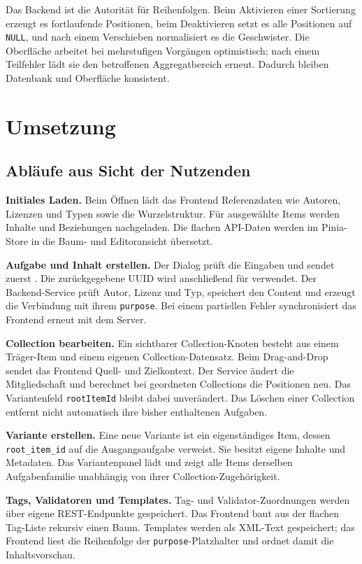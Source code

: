\documentclass[11pt,a4paper]{article}
\begin{document}
Das Backend ist die Autorität für Reihenfolgen. Beim Aktivieren einer
Sortierung erzeugt es fortlaufende Positionen, beim Deaktivieren setzt es alle
Positionen auf \texttt{NULL}, und nach einem Verschieben normalisiert es die
Geschwister. Die Oberfläche arbeitet bei mehrstufigen Vorgängen optimistisch;
nach einem Teilfehler lädt sie den betroffenen Aggregatbereich erneut. Dadurch
bleiben Datenbank und Oberfläche konsistent.

\section{Umsetzung}
\subsection{Abläufe aus Sicht der Nutzenden}
\textbf{Initiales Laden.} Beim Öffnen lädt das Frontend Referenzdaten wie
Autoren, Lizenzen und Typen sowie die Wurzelstruktur. Für ausgewählte Items
werden Inhalte und Beziehungen nachgeladen. Die flachen API-Daten werden im
Pinia-Store in die Baum- und Editoransicht übersetzt.

\textbf{Aufgabe und Inhalt erstellen.} Der Dialog prüft die Eingaben und sendet
zuerst . Die zurückgegebene UUID wird anschließend für
 verwendet. Der Backend-Service
prüft Autor, Lizenz und Typ, speichert den Content und erzeugt die Verbindung
mit ihrem \texttt{purpose}. Bei einem partiellen Fehler synchronisiert das
Frontend erneut mit dem Server.

\textbf{Collection bearbeiten.} Ein sichtbarer Collection-Knoten besteht aus
einem Träger-Item und einem eigenen Collection-Datensatz. Beim Drag-and-Drop
sendet das Frontend Quell- und Zielkontext. Der Service ändert die
Mitgliedschaft und berechnet bei geordneten Collections die Positionen neu.
Das Variantenfeld \texttt{rootItemId} bleibt dabei unverändert. Das Löschen
einer Collection entfernt nicht automatisch ihre bisher enthaltenen Aufgaben.

\textbf{Variante erstellen.} Eine neue Variante ist ein eigenständiges Item,
dessen \texttt{root\_item\_id} auf die Ausgangsaufgabe verweist. Sie besitzt
eigene Inhalte und Metadaten. Das Variantenpanel lädt und zeigt alle Items
derselben Aufgabenfamilie unabhängig von ihrer Collection-Zugehörigkeit.

\textbf{Tags, Validatoren und Templates.} Tag- und Validator-Zuordnungen
werden über eigene REST-Endpunkte gespeichert. Das Frontend baut aus der
flachen Tag-Liste rekursiv einen Baum. Templates werden als XML-Text
gespeichert; das Frontend liest die Reihenfolge der
\texttt{purpose}-Platzhalter und ordnet damit die Inhaltsvorschau.
\end{document}
